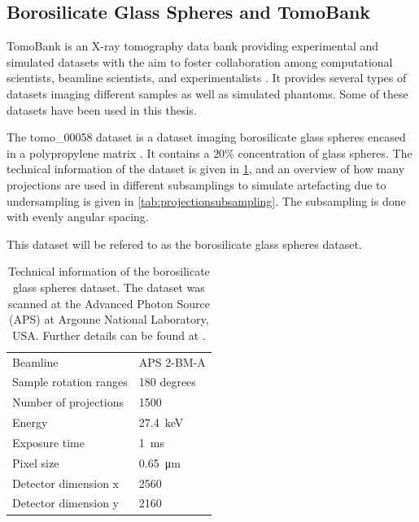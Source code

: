 \subsection{Borosilicate Glass Spheres and TomoBank}
\label{sec:method:datasets:tomo00058}
TomoBank is an X-ray tomography data bank providing experimental and simulated datasets with the aim to foster collaboration among computational scientists, beamline scientists, and experimentalists \cite{TomoBank}. It provides several types of datasets imaging different samples as well as simulated phantoms. Some of these datasets have been used in this thesis.

The tomo\_00058 dataset is a dataset imaging borosilicate glass spheres encased in a polypropylene matrix \cite{datasetglassspheres}. It contains a $20\%$ concentration of glass spheres. The technical information of the dataset is given in \cref{tab:tomo00058}, and an overview of how many projections are used in different subsamplings to simulate artefacting due to undersampling is given in \cref{tab:projectionsubsampling}. The subsampling is done with evenly angular spacing. 

This dataset will be refered to as the borosilicate glass spheres dataset. 

\begin{table}[htbp]
    \centering
    \caption[[Technical information of the borosilicate glass spheres dataset]{Technical information of the borosilicate glass spheres dataset. The dataset was scanned at the Advanced Photon Source (APS) at Argonne National Laboratory, USA. Further details can be found at \cite{datasetglassspheres}. }
    \label{tab:tomo00058}
    \begin{tabular}{ll}
    \hline
    Beamline & APS 2-BM-A\\
    Sample rotation ranges & 180 degrees \\
    Number of projections & 1500 \\
    Energy & \SI{27.4}{\kilo \electronvolt}\\
    Exposure time & \SI{1}{\milli \second}\\
    Pixel size & \SI{0.65}{\micro \meter} \\
    Detector dimension x & 2560 \\
    Detector dimension y & 2160 \\
    \hline
    \end{tabular}
\end{table}

